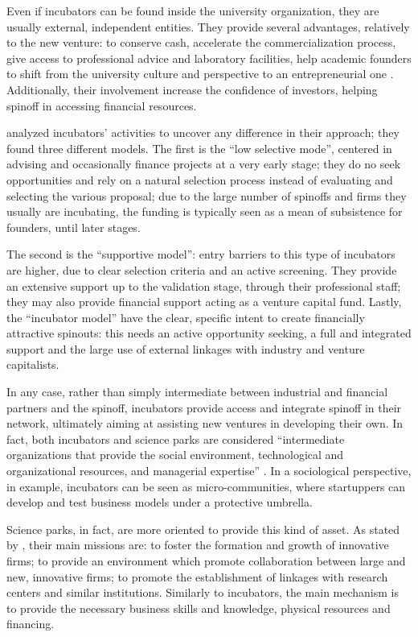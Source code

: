 Even if incubators can be found inside the university organization, they are usually external, independent entities. They provide several advantages, relatively to the new venture: to conserve cash, accelerate the commercialization process, give access to professional advice and laboratory facilities, help academic founders to shift from the university culture and perspective to an entrepreneurial one \citep{Ittelson2002}. Additionally, their involvement increase the confidence of investors, helping spinoff in accessing financial resources.

\citet{Clarysse2005} analyzed incubators' activities to uncover any difference in their approach; they found three different models. The first is the \enquote{low selective mode}, centered in advising and occasionally finance projects at a very early stage; they do no seek opportunities and rely on a natural selection process instead of evaluating and selecting the various proposal; due to the large number of spinoffs and firms they usually are incubating, the funding is typically seen as a mean of subsistence for founders, until later stages. 

The second is the \enquote{supportive model}: entry barriers to this type of incubators are higher, due to clear selection criteria and an active screening. They provide an extensive support up to the validation stage, through their professional staff; they may also provide financial support acting as a venture capital fund. Lastly, the \enquote{incubator model} have the clear, specific intent to create financially attractive spinouts: this needs an active opportunity seeking, a full and integrated support and the large use of external linkages with industry and venture capitalists.

In any case, rather than simply intermediate between industrial and financial partners and the spinoff, incubators provide access and integrate spinoff in their network, ultimately aiming at assisting new ventures in developing their own. In fact, both incubators and science parks are considered \enquote{intermediate organizations that provide the social environment, technological and organizational resources, and managerial expertise} \citep{Phan2005}. In a sociological perspective, in example, incubators can be seen as micro-communities, where startuppers can develop and test business models under a protective umbrella. 

Science parks, in fact, are more oriented to provide this kind of asset. As stated by \citet{Siegel2003}, their main missions are: to foster the formation and growth of innovative firms; to provide an environment which promote collaboration between large and new, innovative firms; to promote the establishment of linkages with research centers and similar institutions. Similarly to incubators, the main mechanism is to provide the necessary business skills and knowledge, physical resources and financing.

